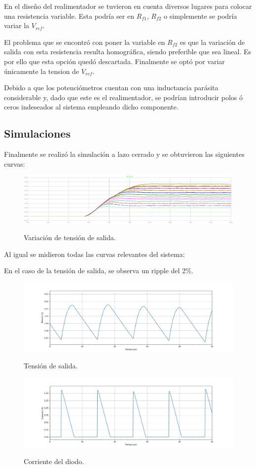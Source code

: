 En el diseño del realimentador se tuvieron en cuenta diversos lugares para colocar una resistencia variable. Esta podría ser en $R_{f1}$, $R_{f2}$ o simplemente se podría variar la $V_{ref}$.

El problema que se encontró con poner la variable en $R_{f2}$ es que la variación de salida con esta resistencia resulta homográfica, siendo preferible que sea lineal. Es por ello que esta opción quedó descartada. Finalmente se optó por variar únicamente la tension de $V_{ref}$.

Debido a que los potenciómetros cuentan con una inductancia parásita considerable y, dado que este es el realimentador, se podrían introducir polos ó ceros indeseados al sistema empleando dicho componente.
 \subsection{Simulaciones}
Finalmente se realizó la simulación a lazo cerrado y se obtuvieron las siguientes curvas:

\begin{figure}[H]
	\centering
	\includegraphics[width=0.9\linewidth]{ImagenesParteIII/Vouts.png}
	\label{fig:vouts_3}
	\caption{Variación de tensión de salida.}
\end{figure}
Al igual se midieron todas las curvas relevantes del sistema:

En el caso de la tensión de salida, se observa un ripple del 2\%.
\begin{figure}[H]
	\centering
	\includegraphics[width=\linewidth]{ImagenesParteIII/ Vo.png}
	\label{fig:vo}
	\caption{Tensión de salida.}
\end{figure}

\begin{figure}[H]
	\centering
	\includegraphics[width=\linewidth]{ImagenesParteIII/Idiodo.png}
	\label{fig:idiodo}
	\caption{Corriente del diodo.}
\end{figure}

